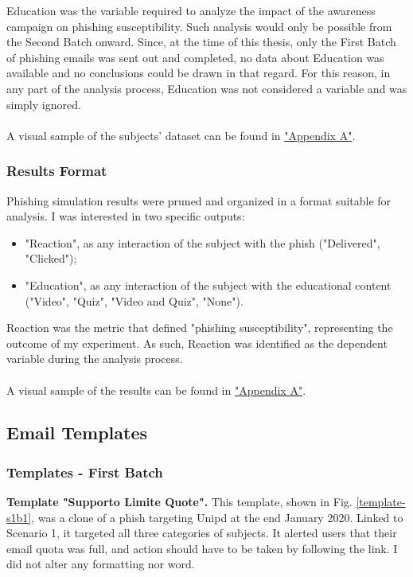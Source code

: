 \documentclass[a4paper]{article}
\begin{document}
Education was the variable required to analyze the impact of the awareness campaign on phishing susceptibility. Such analysis would only be possible from the Second Batch onward. Since, at the time of this thesis, only the First Batch of phishing emails was sent out and completed, no data about Education was available and no conclusions could be drawn in that regard. For this reason, in any part of the analysis process, Education was not considered a variable and was simply ignored.
\\ \\
A visual sample of the subjects' dataset can be found in \hyperlink{appendix-samples-dataset}{"Appendix A"}.

\subsubsection{Results Format}

Phishing simulation results were pruned and organized in a format suitable for analysis. I was interested in two specific outputs:

\begin{itemize}
    \item "Reaction", as any interaction of the subject with the phish ("Delivered", "Clicked");
    \item "Education", as any interaction of the subject with the educational content ("Video", "Quiz", "Video and Quiz", "None").
\end{itemize}

Reaction was the metric that defined "phishing susceptibility", representing the outcome of my experiment. As such, Reaction was identified as the dependent variable during the analysis process.
\\ \\
A visual sample of the results can be found in \hyperlink{appendix-samples-results}{"Appendix A"}.

\newpage

\subsection{Email Templates}

\subsubsection{Templates - First Batch}

\textbf{Template "Supporto Limite Quote".} This template, shown in Fig. \ref{template-s1b1}, was a clone of a phish targeting Unipd at the end January 2020. Linked to Scenario 1, it targeted all three categories of subjects. It alerted users that their email quota was full, and action should have to be taken by following the link. I did not alter any formatting nor word. 
\end{document}
